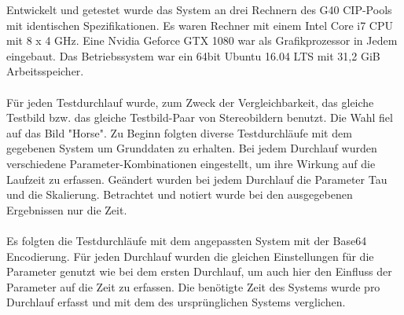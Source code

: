 Entwickelt und getestet wurde das System an drei Rechnern des G40 CIP-Pools mit identischen Spezifikationen. Es waren Rechner mit einem Intel Core i7 CPU mit 8 x 4 GHz. Eine Nvidia Geforce GTX 1080 war als Grafikprozessor in Jedem eingebaut. Das Betriebssystem war ein 64bit Ubuntu 16.04 LTS mit 31,2 GiB Arbeitsspeicher.\\\\
F\"ur jeden Testdurchlauf wurde, zum Zweck der Vergleichbarkeit, das gleiche Testbild bzw. das gleiche Testbild-Paar von Stereobildern benutzt. Die Wahl fiel auf das Bild "Horse". Zu Beginn folgten diverse Testdurchl\"aufe mit dem gegebenen System um Grunddaten zu erhalten. Bei jedem Durchlauf wurden verschiedene Parameter-Kombinationen eingestellt, um ihre Wirkung auf die Laufzeit zu erfassen. Ge\"andert wurden bei jedem Durchlauf die Parameter Tau und die Skalierung. Betrachtet und notiert wurde bei den ausgegebenen Ergebnissen nur die Zeit.\\\\
Es folgten die Testdurchl\"aufe mit dem angepassten System mit der Base64 Encodierung. F\"ur jeden Durchlauf wurden die gleichen Einstellungen f\"ur die Parameter genutzt wie bei dem ersten Durchlauf, um auch hier den Einfluss der Parameter auf die Zeit zu erfassen. Die ben\"otigte Zeit des Systems wurde pro Durchlauf erfasst und mit dem des urspr\"unglichen Systems verglichen.